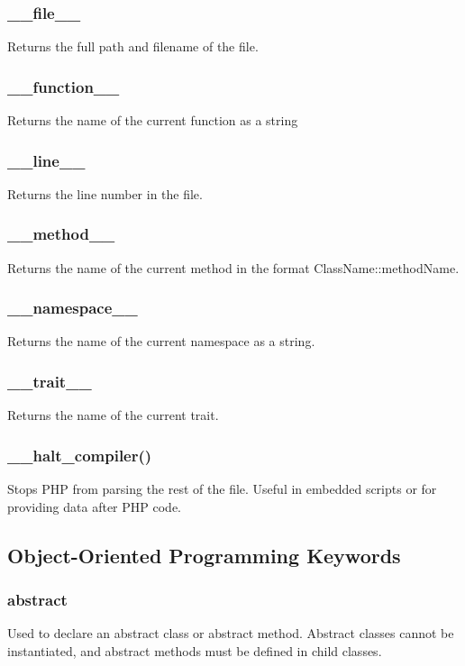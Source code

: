 \documentclass{report}
\begin{document}
    \subsubsection{\_\_file\_\_}
    \bigbreak \noindent 
    Returns the full path and filename of the file.
    \bigbreak \noindent 
    \subsubsection{\_\_function\_\_}
    \bigbreak \noindent 
    Returns the name of the current function as a string
    \bigbreak \noindent 
    \subsubsection{\_\_line\_\_}
    \bigbreak \noindent 
    Returns the line number in the file.
    \bigbreak \noindent 
    \subsubsection{\_\_method\_\_}
    \bigbreak \noindent 
    Returns the name of the current method in the format ClassName::methodName.
    \bigbreak \noindent 
    \subsubsection{\_\_namespace\_\_}
    \bigbreak \noindent 
    Returns the name of the current namespace as a string.
    \bigbreak \noindent 
    \subsubsection{\_\_trait\_\_}
    \bigbreak \noindent 
    Returns the name of the current trait.
    \bigbreak \noindent 
    \subsubsection{\_\_halt\_compiler()}
    \bigbreak \noindent 
    Stops PHP from parsing the rest of the file. Useful in embedded scripts or for providing data after PHP code.

    \pagebreak 
    \subsection{Object-Oriented Programming Keywords}
    \bigbreak \noindent 
    \subsubsection{abstract}
    \bigbreak \noindent 
    Used to declare an abstract class or abstract method. Abstract classes cannot be instantiated, and abstract methods must be defined in child classes.
\end{document}
